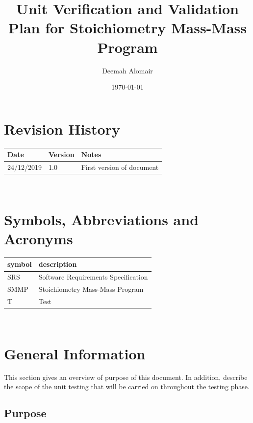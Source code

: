 \documentclass[12pt, titlepage]{article}
\begin{document}
\title{Unit Verification and Validation Plan for Stoichiometry Mass-Mass Program } 
\author{Deemah Alomair}
\date{\today}
	
\maketitle


\section{Revision History}

\begin{tabularx}{\textwidth}{p{3cm}p{2cm}X}
\toprule {\bf Date} & {\bf Version} & {\bf Notes}\\
\midrule
24/12/2019 & 1.0 & First version of document\\
\bottomrule
\end{tabularx}

~\newpage

\tableofcontents

\newpage

\section{Symbols, Abbreviations and Acronyms}

\renewcommand{\arraystretch}{1.2}
\begin{tabular}{l l} 
  \toprule		
  \textbf{symbol} & \textbf{description}\\
  \midrule 
  SRS & Software Requirements Specification \\
  SMMP & Stoichiometry Mass-Mass Program \\
  T & Test \\
  \bottomrule
\end{tabular}\\


\newpage


\section{General Information}

This section gives an overview of purpose of this document. In addition, describe the scope of the unit testing that will be carried on throughout the testing phase. 

\subsection{Purpose}
\end{document}
